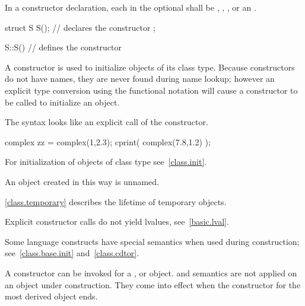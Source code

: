 In a constructor declaration, each  in the optional
 shall be , ,
, or an .
\begin{example}

\begin{codeblock}
struct S {
  S();              // declares the constructor
};

S::S() { }          // defines the constructor
\end{codeblock}
\end{example}

\pnum
{}%
A constructor is used to initialize objects of its class type.
Because constructors do not have names, they are never found during
name lookup; however an explicit type conversion using the functional
notation will cause a constructor to be called to
initialize an object.
\begin{note}
The syntax looks like an explicit call of the constructor.
\end{note}
\begin{example}
\begin{codeblock}
complex zz = complex(1,2.3);
cprint( complex(7.8,1.2) );
\end{codeblock}
\end{example}
\begin{note}
For initialization of objects of class type see~\ref{class.init}.
\end{note}

\pnum
{}%
An object created in this way is unnamed.
\begin{note}
\ref{class.temporary} describes the lifetime of temporary objects.
\end{note}
\begin{note}
Explicit constructor calls do not yield lvalues, see~\ref{basic.lval}.
\end{note}

\pnum
\begin{note}
%
Some language constructs have special semantics when used during construction;
see~\ref{class.base.init} and~\ref{class.cdtor}.
\end{note}

\pnum
{}%
%
A constructor can be invoked for a
,
or
object.
%
and
semantics are not applied on an object under construction.
They come into effect when the constructor for the
most derived object ends.


